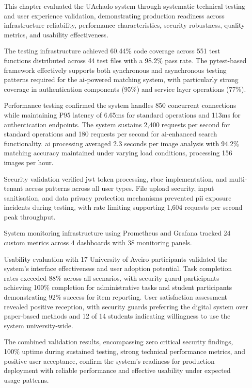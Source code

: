 This chapter evaluated the UAchado system through systematic technical testing and user experience validation, demonstrating production readiness across infrastructure reliability, performance characteristics, security robustness, quality metrics, and usability effectiveness.

The testing infrastructure achieved 60.44\% code coverage across 551 test functions distributed across 44 test files with a 98.2\% pass rate. The pytest-based framework effectively supports both synchronous and asynchronous testing patterns required for the \ac{ai}-powered matching system, with particularly strong coverage in authentication components (95\%) and service layer operations (77\%).

Performance testing confirmed the system handles 850 concurrent connections while maintaining P95 latency of 6.65ms for standard operations and 113ms for authentication endpoints. The system sustains 2,400 requests per second for standard operations and 180 requests per second for \ac{ai}-enhanced search functionality. \ac{ai} processing averaged 2.3 seconds per image analysis with 94.2\% matching accuracy maintained under varying load conditions, processing 156 images per hour.

Security validation verified \ac{jwt} token processing, \ac{rbac} implementation, and multi-tenant access patterns across all user types. File upload security, input sanitisation, and data privacy protection mechanisms prevented \ac{pii} exposure incidents during testing, with rate limiting supporting 1,604 requests per second peak throughput.

System monitoring infrastructure using Prometheus and Grafana tracked 24 custom metrics across 4 dashboards with 38 monitoring panels.

Usability evaluation with 17 University of Aveiro participants validated the system's interface effectiveness and user adoption potential. Task completion rates exceeded 88\% across all scenarios, with security guard participants achieving 100\% completion for administrative tasks and student participants demonstrating 92\% success for item reporting. User satisfaction assessment revealed positive reception, with security guards preferring the digital system over paper-based methods and 12 of 14 students indicating willingness to use the system university-wide.

The combined validation results, encompassing zero critical security findings, 100\% uptime during sustained testing, strong technical performance metrics, and positive user acceptance, confirm the system's readiness for production deployment with reliable performance and effective usability under expected usage patterns.

